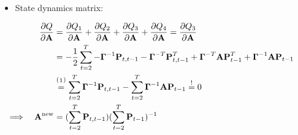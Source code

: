 		\begin{itemize}
			\item State dynamics matrix:
		\end{itemize}
		\begin{align*}
			&& \pdv{Q}{\mat{A}}
				&= \pdv{Q_1}{\mat{A}} + \pdv{Q_2}{\mat{A}} + \pdv{Q_3}{\mat{A}} + \pdv{Q_4}{\mat{A}} = \pdv{Q_3}{\mat{A}} & \\
			&&	&= -\frac{1}{2} \sum_{t = 2}^{T} - \mat{\Gamma}^{-1} \mat{P}_{t, t - 1} - \mat{\Gamma}^{-T} \mat{P}_{t, t - 1}^T + \mat{\Gamma}^{-T} \mat{A} \mat{P}_{t - 1}^T + \mat{\Gamma}^{-1} \mat{A} \mat{P}_{t - 1} & \\
			&&	&\oversetfootnotemark{=} \sum_{t = 2}^{T} \mat{\Gamma}^{-1} \mat{P}_{t, t - 1} - \sum_{t = 2}^{T} \mat{\Gamma}^{-1} \mat{A} \mat{P}_{t - 1} \overset{!}{=} 0 & \\
			\implies && \mat{A}^\new &= \paren{\sum_{t = 2}^{T} \mat{P}_{t, t - 1}} \paren{\sum_{t = 2}^{T} \mat{P}_{t - 1}}^{-1} &
		\end{align*}
		
